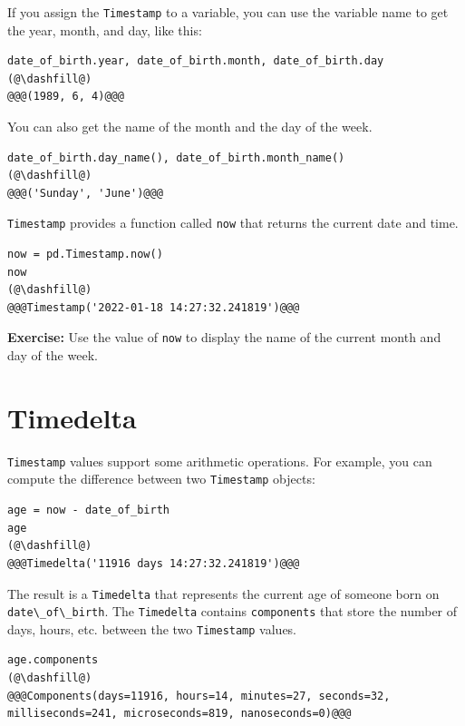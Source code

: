 If you assign the \passthrough{\lstinline!Timestamp!} to a variable, you
can use the variable name to get the year, month, and day, like this:

\begin{lstlisting}[]
date_of_birth.year, date_of_birth.month, date_of_birth.day
(@\dashfill@)
@@@(1989, 6, 4)@@@
\end{lstlisting}

You can also get the name of the month and the day of the week.

\begin{lstlisting}[]
date_of_birth.day_name(), date_of_birth.month_name()
(@\dashfill@)
@@@('Sunday', 'June')@@@
\end{lstlisting}

\passthrough{\lstinline!Timestamp!} provides a function called
\passthrough{\lstinline!now!} that returns the current date and time.

\begin{lstlisting}[]
now = pd.Timestamp.now()
now
(@\dashfill@)
@@@Timestamp('2022-01-18 14:27:32.241819')@@@
\end{lstlisting}

\textbf{Exercise:} Use the value of \passthrough{\lstinline!now!} to
display the name of the current month and day of the week.

\hypertarget{timedelta}{%
\section{Timedelta}\label{timedelta}}

\passthrough{\lstinline!Timestamp!} values support some arithmetic
operations. For example, you can compute the difference between two
\passthrough{\lstinline!Timestamp!} objects:

\begin{lstlisting}[]
age = now - date_of_birth
age
(@\dashfill@)
@@@Timedelta('11916 days 14:27:32.241819')@@@
\end{lstlisting}

The result is a \passthrough{\lstinline!Timedelta!} that represents the
current age of someone born on
\passthrough{\lstinline!date\_of\_birth!}. The
\passthrough{\lstinline!Timedelta!} contains
\passthrough{\lstinline!components!} that store the number of days,
hours, etc. between the two \passthrough{\lstinline!Timestamp!} values.

\begin{lstlisting}[]
age.components
(@\dashfill@)
@@@Components(days=11916, hours=14, minutes=27, seconds=32, milliseconds=241, microseconds=819, nanoseconds=0)@@@
\end{lstlisting}

